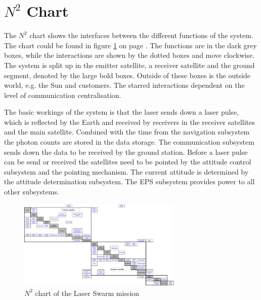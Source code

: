 \section{$N^2$ Chart}
The $N^2$ chart shows the interfaces between the different functions of the system. The chart could be found in figure \ref{fig:n2chart} on page \pageref{fig:n2chart}. The functions are in the dark grey boxes, while the interactions are shown by the dotted boxes and move clockwise. The system is split up in the emitter satellite, a receiver satellite and the ground segment, denoted by the large bold boxes. Outside of these boxes is the outside world, e.g. the Sun and customers. The starred interactions dependent on the level of communication centralisation.

The basic workings of the system is that the laser sends down a laser pulse, which is reflected by the Earth and received by receivers in the receiver satellites and the main satellite. Combined with the time from the navigation subsystem the photon counts are stored in the data storage. The communication subsystem sends down the data to be received by the ground station. Before a laser pulse can be send or received the satellites need to be pointed by the attitude control subsystem and the pointing mechanism. The current attitude is determined by the attitude determination subsystem. The \ac{EPS} subsystem provides power to all other subsystems. 

\begin{figure}
\centering
\includegraphics[angle = 90, width = 0.7\textwidth, bb= 0 0 3421px 1861px]{img/N2chart_wo.png} 
\caption{$N^2$ chart of the Laser Swarm mission}
\label{fig:n2chart}
\end{figure}
